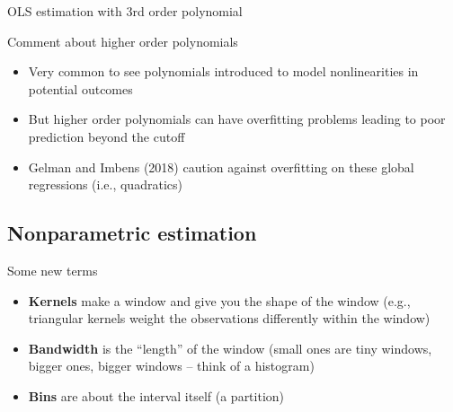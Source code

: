 \documentclass{beamer}
\begin{document}
\begin{frame}{OLS estimation with 3rd order polynomial}
	
	\begin{figure}
	\end{figure}

	
\end{frame}

\begin{frame}{Comment about higher order polynomials}

\begin{itemize}
\item Very common to see polynomials introduced to model nonlinearities in potential outcomes
\item But higher order polynomials can have overfitting problems leading to poor prediction beyond the cutoff 
\item Gelman and Imbens (2018) caution against overfitting on these global regressions (i.e., quadratics) 
\end{itemize}

\end{frame}


\subsection{Nonparametric estimation}

\begin{frame}{Some new terms}

\begin{itemize}

\item \textbf{Kernels} make a window and give you the shape of the window (e.g., triangular kernels weight the observations differently within the window)
\item \textbf{Bandwidth} is the ``length'' of the window (small ones are tiny windows, bigger ones, bigger windows -- think of a histogram)
\item \textbf{Bins} are about the interval itself (a partition)

\end{itemize}

\end{frame}
\end{document}
